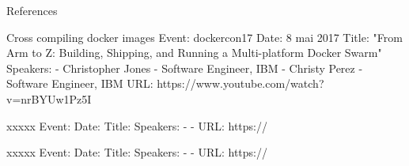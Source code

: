 

References
\ifpdf
    \graphicspath{{Chapter3/Figs/Raster/}{Chapter3/Figs/PDF/}{Chapter3/Figs/}}
\else
    \graphicspath{{Chapter3/Figs/Vector/}{Chapter3/Figs/}}
\fi


Cross compiling docker images
    Event: dockercon17
    Date: 8 mai 2017
    Title: "From Arm to Z: Building, Shipping, and Running a Multi-platform Docker Swarm"
    Speakers:
        - Christopher Jones - Software Engineer, IBM
        - Christy Perez - Software Engineer, IBM
    URL: https://www.youtube.com/watch?v=nrBYUw1Pz5I

xxxxx
    Event:
    Date:
    Title:
    Speakers:
        - 
        - 
    URL: https://

xxxxx
    Event:
    Date:
    Title:
    Speakers:
        - 
        - 
    URL: https://
